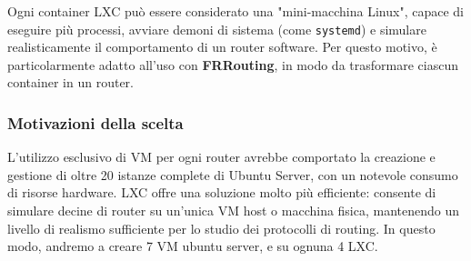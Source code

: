\documentclass[12pt,a4paper,twoside]{book}
\begin{document}
Ogni container LXC può essere considerato una "mini-macchina Linux", capace di eseguire più processi, avviare demoni di sistema (come \texttt{systemd}) e simulare realisticamente il comportamento di un router software. Per questo motivo, è particolarmente adatto all’uso con \textbf{FRRouting}, in modo da trasformare ciascun container in un router.

\subsubsection{Motivazioni della scelta}
L’utilizzo esclusivo di \ac{VM} per ogni router avrebbe comportato la creazione e gestione di oltre 20 istanze complete di Ubuntu Server, con un notevole consumo di risorse hardware. LXC offre una soluzione molto più efficiente: consente di simulare decine di router su un'unica \ac{VM} host o macchina fisica, mantenendo un livello di realismo sufficiente per lo studio dei protocolli di routing.
In questo modo, andremo a creare 7 \ac{VM} ubuntu server, e su ognuna 4 \ac{LXC}.
\end{document}
